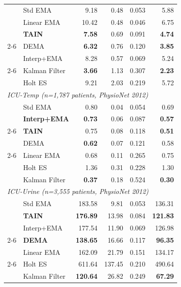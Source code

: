 \documentclass[11pt,a4paper]{article}
\begin{document}
\begin{table}[h]
\begin{tabular}{ll rrrr}
& Std EMA           &   9.18 &  0.48 & 0.053 &  5.88 \\
& Linear EMA        &  10.42 &  0.48 & 0.046 &  6.75 \\
& \textbf{TAIN}     &   \textbf{7.58} &  0.69 & 0.091 &  \textbf{4.74} \\
\cmidrule{2-6}
& DEMA              &   \textbf{6.32} &  0.76 & 0.120 &  \textbf{3.85} \\
& Interp+EMA        &   8.28 &  0.57 & 0.069 &  5.24 \\
\cmidrule{2-6}
& Kalman Filter     &   \textbf{3.66} &  1.13 & 0.307 &  \textbf{2.23} \\
& Holt ES           &   9.21 &  2.03 & 0.219 &  5.72 \\
\midrule
\multicolumn{6}{l}{\textit{ICU-Temp (n=1{,}787 patients, PhysioNet 2012)}} \\
& Std EMA           &   0.80 &  0.04 & 0.054 &   0.69 \\
& \textbf{Interp+EMA} & \textbf{0.73} &  0.06 & 0.087 & \textbf{0.57} \\
\cmidrule{2-6}
& \textbf{TAIN}     &   0.75 &  0.08 & 0.118 & \textbf{0.51} \\
& DEMA              & \textbf{0.62} &  0.07 & 0.121 &   0.58 \\
\cmidrule{2-6}
& Linear EMA        &   0.68 &  0.11 & 0.265 &   0.75 \\
& Holt ES           &   1.36 &  0.31 & 0.228 &   1.30 \\
& Kalman Filter     & \textbf{0.37} &  0.18 & 0.524 & \textbf{0.30} \\
\midrule
\multicolumn{6}{l}{\textit{ICU-Urine (n=3{,}555 patients, PhysioNet 2012)}} \\
& Std EMA           & 183.58 &   9.81 & 0.053 & 136.31 \\
& \textbf{TAIN}     & \textbf{176.89} &  13.98 & 0.084 & \textbf{121.83} \\
& Interp+EMA        & 177.54 &  11.90 & 0.069 & 126.98 \\
\cmidrule{2-6}
& \textbf{DEMA}     & \textbf{138.65} &  16.66 & 0.117 & \textbf{96.35} \\
& Linear EMA        & 162.09 &  21.79 & 0.151 & 134.17 \\
\cmidrule{2-6}
& Holt ES           & 611.64 & 137.45 & 0.210 & 490.64 \\
& Kalman Filter     & \textbf{120.64} &  26.82 & 0.249 & \textbf{67.29} \\
\bottomrule
\end{tabular}
\end{table}
\end{document}

